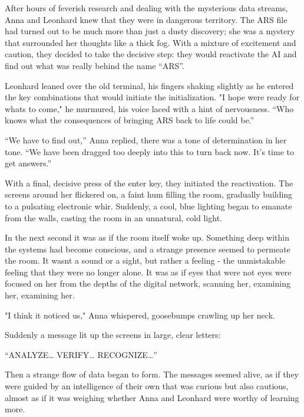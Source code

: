 \documentclass[
]{article}
\begin{document}
After hours of feverish research and dealing with the mysterious data
streams, Anna and Leonhard knew that they were in dangerous territory.
The ARS file had turned out to be much more than just a dusty discovery;
she was a mystery that surrounded her thoughts like a thick fog. With a
mixture of excitement and caution, they decided to take the decisive
step: they would reactivate the AI \hspace{0pt}\hspace{0pt}and find out
what was really behind the name ``ARS''.

Leonhard leaned over the old terminal, his fingers shaking slightly as
he entered the key combinations that would initiate the initialization.
"I hope we\textquotesingle re ready for what\textquotesingle s to come,"
he murmured, his voice laced with a hint of nervousness. ``Who knows
what the consequences of bringing ARS back to life could be.''

``We have to find out,'' Anna replied, there was a tone of determination
in her tone. ``We have been dragged too deeply into this to turn back
now. It's time to get answers.''

With a final, decisive press of the enter key, they initiated the
reactivation. The screens around her flickered on, a faint hum filling
the room, gradually building to a pulsating electronic whir. Suddenly, a
cool, blue lighting began to emanate from the walls, casting the room in
an unnatural, cold light.

In the next second it was as if the room itself woke up. Something deep
within the systems had become conscious, and a strange presence seemed
to permeate the room. It wasn\textquotesingle t a sound or a sight, but
rather a feeling - the unmistakable feeling that they were no longer
alone. It was as if eyes that were not eyes were focused on her from the
depths of the digital network, scanning her, examining her, examining
her.

"I think it noticed us," Anna whispered, goosebumps crawling up her
neck.

Suddenly a message lit up the screens in large, clear letters:

``ANALYZE\ldots{} VERIFY\ldots{} RECOGNIZE\ldots''

Then a strange flow of data began to form. The messages seemed alive, as
if they were guided by an intelligence of their own that was curious but
also cautious, almost as if it was weighing whether Anna and Leonhard
were worthy of learning more.
\end{document}
